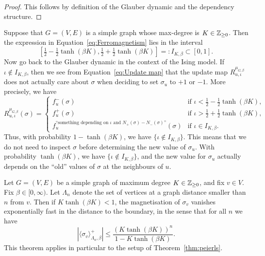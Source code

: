 \begin{proof}
    This follows by definition of the Glauber dynamic and the dependency structure.
\end{proof}

Suppose that $G=(V,E)$ is a simple graph whose max-degree is $K\in\mathbb Z_{\geq 0}$.
Then the expression in Equation~\eqref{eq:Ferromagnetism} lies in the interval
\begin{equation}
    \label{eq:constrained_interval}
    [\tfrac12 - \tfrac12 \tanh (\beta K),\tfrac12 + \tfrac12 \tanh (\beta K)]=:
    I_{K,\beta}\subset [0,1].
\end{equation}
Now go back to the Glauber dynamic in the context of the Ising model.
If $\iota\not\in I_{K,\beta}$,
then we see from Equation~\eqref{eq:Update map} that the update map $R_{u,\iota}^{\mu_{G,\beta}}$
does not actually care about $\sigma$ when deciding to set $\sigma_u$ to $+1$ or $-1$.
More precisely, we have
\[
    R_{u,\iota}^{\mu_{G,\beta}}(\sigma)
    =
    \begin{cases}
        f_u^-(\sigma) & \text{if $\iota < \tfrac12 - \tfrac12 \tanh (\beta K)$,} \\
        f_u^+(\sigma) & \text{if $\iota > \tfrac12 + \tfrac12 \tanh (\beta K)$,} \\
        f_u^{\text{``something depending on $\iota$ and
        $N_+(\sigma)-N_-(\sigma)$''}}(\sigma) & \text{if $\iota\in I_{K,\beta}$.}
    \end{cases}
\]
Thus, with probability $1-\tanh(\beta K)$,
we have $\{\iota\not\in I_{K,\beta}\}$.
This means that we do not need to inspect $\sigma$ before determining the new value of $\sigma_u$.
With probability $\tanh(\beta K)$, we have $\{\iota\not\in I_{K,\beta}\}$,
and the new value for $\sigma_u$ actually depends on the ``old'' values of $\sigma$
at the neighbours of $u$.

\begin{theorem}
    Let $G=(V,E)$ be a simple graph of maximum degree $K\in\mathbb Z_{\geq 0}$,
    and fix $v\in V$.
    Fix $\beta\in[0,\infty)$.
    Let $\Lambda_n$ denote the set of vertices at a graph distance smaller than $n$ from $v$.
    Then if $K\tanh(\beta K)<1$, the magnetisation of $\sigma_v$ vanishes exponentially
    fast in the distance to the boundary,
    in the sense that for all $n$ we have
    \[
        |\langle\sigma_v\rangle_{\Lambda_n,\beta}^+| \leq \frac{(K\tanh(\beta
        K))^n}{1-K\tanh(\beta K)}.
    \]
    This theorem applies in particular to the setup of Theorem~\ref{thm:peierls}.
\end{theorem}


